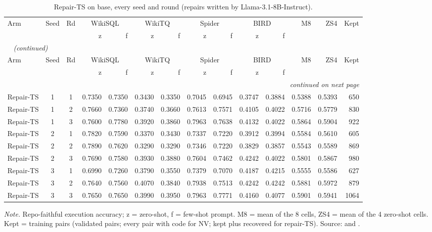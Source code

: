 {\small
{}
\setlength{\tabcolsep}{4.2pt}
\begin{longtable}{@{}lccrrrrrrrrrrr@{}}
\caption{Repair-TS on base, every seed and round (repairs written by Llama-3.1-8B-Instruct).}\label{tab:gen-perseed_repair_base}\\
\toprule
\rowcolor{headshade}Arm & Seed & Rd & \multicolumn{2}{c}{WikiSQL} & \multicolumn{2}{c}{WikiTQ} & \multicolumn{2}{c}{Spider} & \multicolumn{2}{c}{BIRD} & M8 & ZS4 & Kept\\\rowcolor{headshade} & & & z & f & z & f & z & f & z & f & & &\\
\midrule
\endfirsthead
\multicolumn{14}{l}{\textit{\tablename~\thetable{} (continued)}}\\
\toprule
\rowcolor{headshade}Arm & Seed & Rd & \multicolumn{2}{c}{WikiSQL} & \multicolumn{2}{c}{WikiTQ} & \multicolumn{2}{c}{Spider} & \multicolumn{2}{c}{BIRD} & M8 & ZS4 & Kept\\\rowcolor{headshade} & & & z & f & z & f & z & f & z & f & & &\\
\midrule
\endhead
\midrule
\multicolumn{14}{r}{\textit{continued on next page}}\\
\endfoot
\bottomrule
\endlastfoot
Repair-TS & 1 & 1 & 0.7350 & 0.7350 & 0.3430 & 0.3350 & 0.7045 & 0.6945 & 0.3747 & 0.3884 & 0.5388 & 0.5393 & 650\\
Repair-TS & 1 & 2 & 0.7660 & 0.7360 & 0.3740 & 0.3660 & 0.7613 & 0.7571 & 0.4105 & 0.4022 & 0.5716 & 0.5779 & 830\\
Repair-TS & 1 & 3 & 0.7600 & 0.7780 & 0.3920 & 0.3860 & 0.7963 & 0.7638 & 0.4132 & 0.4022 & 0.5864 & 0.5904 & 922\\
Repair-TS & 2 & 1 & 0.7820 & 0.7590 & 0.3370 & 0.3430 & 0.7337 & 0.7220 & 0.3912 & 0.3994 & 0.5584 & 0.5610 & 605\\
Repair-TS & 2 & 2 & 0.7890 & 0.7620 & 0.3290 & 0.3290 & 0.7346 & 0.7220 & 0.3829 & 0.3857 & 0.5543 & 0.5589 & 869\\
Repair-TS & 2 & 3 & 0.7690 & 0.7580 & 0.3930 & 0.3880 & 0.7604 & 0.7462 & 0.4242 & 0.4022 & 0.5801 & 0.5867 & 980\\
Repair-TS & 3 & 1 & 0.6990 & 0.7260 & 0.3790 & 0.3550 & 0.7379 & 0.7070 & 0.4187 & 0.4215 & 0.5555 & 0.5586 & 627\\
Repair-TS & 3 & 2 & 0.7640 & 0.7560 & 0.4070 & 0.3840 & 0.7938 & 0.7513 & 0.4242 & 0.4242 & 0.5881 & 0.5972 & 879\\
Repair-TS & 3 & 3 & 0.7650 & 0.7650 & 0.3990 & 0.3950 & 0.7963 & 0.7771 & 0.4160 & 0.4077 & 0.5901 & 0.5941 & 1064\\
\end{longtable}
}
\vspace{-0.6\baselineskip}
{\footnotesize\color{slate}\textit{Note.} Repo-faithful execution accuracy; z = zero-shot, f = few-shot prompt. M8 = mean of the 8 cells, ZS4 = mean of the 4 zero-shot cells. Kept = training pairs (validated pairs; every pair with code for NV; kept plus recovered for repair-TS). Source:  and .\par}
\medskip
